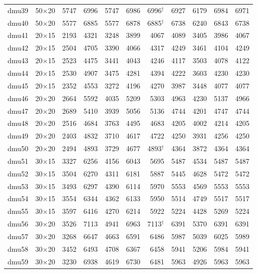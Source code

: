 {\begin{longtable}{lrrrrrrrrrr}
dmu39 & 50$\times$20 & 5747 & 6996 & 5747 & 6986 & 6996$^\dagger$ & 6927 & 6179 & 6984 & 6971 \\
dmu40 & 50$\times$20 & 5577 & 6885 & 5577 & 6878 & 6885$^\dagger$ & 6738 & 6240 & 6843 & 6738 \\
dmu41 & 20$\times$15 & 2193 & 4321 & 3248 & 3899 & 4067 & 4089 & 3405 & 3986 & 4067 \\
dmu42 & 20$\times$15 & 2504 & 4705 & 3390 & 4066 & 4317 & 4249 & 3461 & 4104 & 4249 \\
dmu43 & 20$\times$15 & 2523 & 4475 & 3441 & 4043 & 4246 & 4117 & 3503 & 4078 & 4122 \\
dmu44 & 20$\times$15 & 2530 & 4907 & 3475 & 4281 & 4394 & 4222 & 3603 & 4230 & 4230 \\
dmu45 & 20$\times$15 & 2352 & 4553 & 3272 & 4196 & 4270 & 3987 & 3448 & 4077 & 4077 \\
dmu46 & 20$\times$20 & 2664 & 5592 & 4035 & 5209 & 5303 & 4963 & 4230 & 5137 & 4966 \\
dmu47 & 20$\times$20 & 2689 & 5410 & 3939 & 5056 & 5136 & 4744 & 4201 & 4747 & 4744 \\
dmu48 & 20$\times$20 & 2516 & 4684 & 3763 & 4495 & 4683 & 4205 & 4002 & 4214 & 4205 \\
dmu49 & 20$\times$20 & 2403 & 4832 & 3710 & 4617 & 4722 & 4250 & 3931 & 4256 & 4250 \\
dmu50 & 20$\times$20 & 2494 & 4893 & 3729 & 4677 & 4893$^\dagger$ & 4364 & 3872 & 4364 & 4364 \\
dmu51 & 30$\times$15 & 3327 & 6256 & 4156 & 6043 & 5695 & 5487 & 4534 & 5487 & 5487 \\
dmu52 & 30$\times$15 & 3504 & 6270 & 4311 & 6181 & 5887 & 5445 & 4628 & 5472 & 5472 \\
dmu53 & 30$\times$15 & 3493 & 6297 & 4390 & 6114 & 5970 & 5553 & 4569 & 5553 & 5553 \\
dmu54 & 30$\times$15 & 3554 & 6344 & 4362 & 6133 & 5950 & 5514 & 4749 & 5517 & 5517 \\
dmu55 & 30$\times$15 & 3597 & 6416 & 4270 & 6214 & 5922 & 5224 & 4428 & 5269 & 5224 \\
dmu56 & 30$\times$20 & 3526 & 7113 & 4941 & 6963 & 7113$^\dagger$ & 6391 & 5370 & 6391 & 6391 \\
dmu57 & 30$\times$20 & 3268 & 6647 & 4663 & 6591 & 6486 & 5987 & 5039 & 6025 & 5989 \\
dmu58 & 30$\times$20 & 3452 & 6493 & 4708 & 6367 & 6458 & 5941 & 5206 & 5984 & 5941 \\
dmu59 & 30$\times$20 & 3230 & 6938 & 4619 & 6730 & 6481 & 5963 & 4926 & 5963 & 5963 \\

\end{longtable}}
